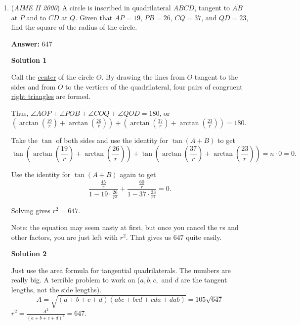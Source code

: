 \begin{enumerate}
 By De Moivre's Theorem, 
 \[z^{2000} + \frac{1}{z^{2000}} = \text{cis} (6000)^{\circ} + \text{cis} (-6000)^{\circ}\]. The imaginary parts cancel, leaving us with $2 \cos{6000^{\circ}}$, which is $240 \pmod{360}$. Therefore, it is $-1$, and our answer is $\boxed{000}$. 

 Now, if $b=0$ then we have that $a+\frac{1}{a} = 2 \cos{3^{\circ}}$. Therefore, $a$ is not violating our conditions set above.

 


	\item (\textit{AIME II 2000}) A circle is inscribed in quadrilateral $ABCD$, tangent to $\overline{AB}$ at $P$ and to $\overline{CD}$ at $Q$. Given that $AP=19$, $PB=26$, $CQ=37$, and $QD=23$, find the square of the radius of the circle.


 
 \textbf{Answer: }647



\textbf{Solution 1}

Call the \href{https://artofproblemsolving.com/wiki/index.php?title=Center}{center} of the circle $O$. By drawing the lines from $O$ tangent to the sides and from $O$ to the vertices of the quadrilateral, four pairs of congruent \href{https://artofproblemsolving.com/wiki/index.php?title=Right\_triangle}{right triangles} are formed.

 Thus, $\angle{AOP}+\angle{POB}+\angle{COQ}+\angle{QOD}=180$, or $(\arctan(\frac{19}{r})+\arctan(\frac{26}{r}))+(\arctan(\frac{37}{r})+\arctan(\frac{23}{r}))=180$.

 Take the $\tan$ of both sides and use the identity for $\tan(A+B)$ to get 
 \[\tan(\arctan(\frac{19}{r})+\arctan(\frac{26}{r}))+\tan(\arctan(\frac{37}{r})+\arctan(\frac{23}{r}))=n\cdot0=0.\]

 Use the identity for $\tan(A+B)$ again to get 
 \[\frac{\frac{45}{r}}{1-19\cdot\frac{26}{r^2}}+\frac{\frac{60}{r}}{1-37\cdot\frac{23}{r^2}}=0.\]

 Solving gives $r^2=\boxed{647}$.

 Note: the equation may seem nasty at first, but once you cancel the $r$s and other factors, you are just left with $r^2$. That gives us $647$ quite easily.

 



\textbf{Solution 2}

Just use the area formula for tangential quadrilaterals. The numbers are really big. A terrible problem to work on ($a, b, c,$ and $d$ are the tangent lengths, not the side lengths).
 \[A = \sqrt{(a+b+c+d)(abc+bcd+cda+dab)} = 105\sqrt{647}\]$r^2=\frac{A^2}{(a+b+c+d)^2} = \boxed{647}$.


\end{enumerate}
